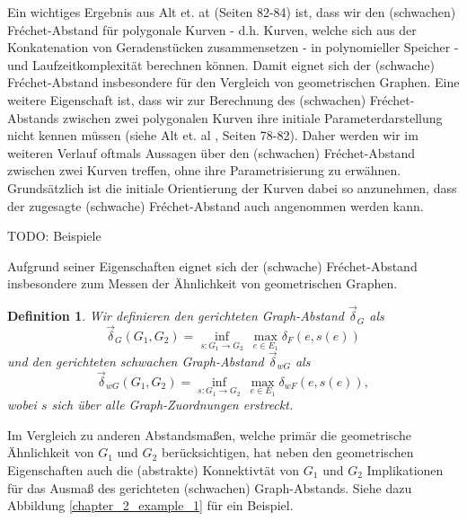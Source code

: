 \documentclass[a4paper, 12pt, twoside]{article}
\theoremstyle{Format1} %
\newtheorem{Def}{Definition}[section]       %
\begin{document}
Ein wichtiges Ergebnis aus Alt et. at \cite{Alt} (Seiten 82-84) ist, dass wir den (schwachen) Fréchet-Abstand für polygonale Kurven - d.h. Kurven, welche sich aus der Konkatenation von Geradenstücken zusammensetzen - in
polynomieller Speicher - und Laufzeitkomplexität berechnen können. Damit eignet sich der (schwache) Fréchet-Abstand insbesondere für den Vergleich von geometrischen Graphen. Eine weitere Eigenschaft ist,
dass wir zur Berechnung des (schwachen) Fréchet-Abstands zwischen zwei polygonalen Kurven ihre initiale Parameterdarstellung nicht kennen müssen (siehe Alt et. al \cite{Alt}, Seiten 78-82).
Daher werden wir im weiteren Verlauf oftmals Aussagen über den (schwachen) Fréchet-Abstand zwischen zwei Kurven treffen, ohne ihre Parametrisierung zu erwähnen. Grundsätzlich ist die initiale Orientierung der Kurven dabei
so anzunehmen, dass der zugesagte (schwache) Fréchet-Abstand auch angenommen werden kann.

TODO: Beispiele

Aufgrund seiner Eigenschaften eignet sich der (schwache) Fréchet-Abstand insbesondere zum Messen der Ähnlichkeit von geometrischen Graphen.

\begin{Def} \label{Definition Graph-Abstand}
	Wir definieren den \textit{gerichteten Graph-Abstand} $ \vec{\delta}_G $ als
	$$ \vec{\delta}_G(G_1,G_2) = \inf_{s: G_1 \to G_2} \: \max_{e \in E_1} \delta_F(e, s(e)) $$
	und den \textit{gerichteten schwachen Graph-Abstand} $ \vec{\delta}_{wG} $ als
	$$  \vec{\delta}_{wG}(G_1,G_2) = \inf_{s: G_1 \to G_2} \: \max_{e \in E_1} {\delta}_{wF}(e, s(e)), $$
	wobei $s$ sich über alle Graph-Zuordnungen erstreckt.
\end{Def}

Im Vergleich zu anderen Abstandsmaßen,
welche primär die geometrische Ähnlichkeit von $G_1$ und $G_2$ berücksichtigen, hat neben den geometrischen Eigenschaften auch die (abstrakte) Konnektivtät von $G_1$ und $G_2$
Implikationen für das Ausmaß des gerichteten (schwachen) Graph-Abstands. Siehe dazu Abbildung \ref{chapter_2_example_1} für ein Beispiel.
\end{document}
